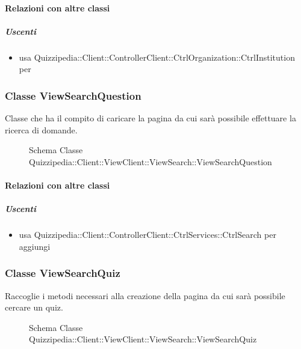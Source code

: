 \paragraph{Relazioni con altre classi}
\subparagraph{Uscenti}
\begin{itemize}
\item usa Quizzipedia::Client::ControllerClient::CtrlOrganization::CtrlInstitution per 
\end{itemize}
\subsubsection{Classe ViewSearchQuestion}
Classe che ha il compito di caricare la pagina da cui sarà possibile effettuare la ricerca di domande.
\begin{figure}[H]
\centering
\noindent{}
\caption[Schema Classe ViewSearchQuestion]{Schema Classe Quizzipedia::Client::ViewClient::ViewSearch::ViewSearchQuestion}
\end{figure}
\paragraph{Relazioni con altre classi}
\subparagraph{Uscenti}
\begin{itemize}
\item usa Quizzipedia::Client::ControllerClient::CtrlServices::CtrlSearch per aggiungi
\end{itemize}
\subsubsection{Classe ViewSearchQuiz}
Raccoglie i metodi necessari alla creazione della pagina da cui sarà possibile cercare un quiz.
\begin{figure}[H]
\centering
\noindent{}
\caption[Schema Classe ViewSearchQuiz]{Schema Classe Quizzipedia::Client::ViewClient::ViewSearch::ViewSearchQuiz}
\end{figure}

